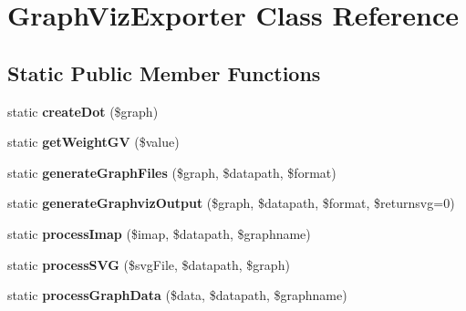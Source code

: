 \hypertarget{classGraphVizExporter}{
\section{GraphVizExporter Class Reference}
\label{classGraphVizExporter}
}
\subsection*{Static Public Member Functions}
\begin{DoxyCompactItemize}
\item 
\hypertarget{classGraphVizExporter_a63ee3eef62e8e371f65a7b835ff7e03e}{
static {\bfseries createDot} (\$graph)}
\label{classGraphVizExporter_a63ee3eef62e8e371f65a7b835ff7e03e}

\item 
\hypertarget{classGraphVizExporter_ab48d8f07e6c16c1e822cc762b5276b0c}{
static {\bfseries getWeightGV} (\$value)}
\label{classGraphVizExporter_ab48d8f07e6c16c1e822cc762b5276b0c}

\item 
\hypertarget{classGraphVizExporter_a5ffcde0b5a56dd0a8ac57680f247520b}{
static {\bfseries generateGraphFiles} (\$graph, \$datapath, \$format)}
\label{classGraphVizExporter_a5ffcde0b5a56dd0a8ac57680f247520b}

\item 
\hypertarget{classGraphVizExporter_a7f97288f0c6800015bbe0101cbe38b7d}{
static {\bfseries generateGraphvizOutput} (\$graph, \$datapath, \$format, \$returnsvg=0)}
\label{classGraphVizExporter_a7f97288f0c6800015bbe0101cbe38b7d}

\item 
\hypertarget{classGraphVizExporter_ae10671113e79e66c0cd8b5ea3113b76c}{
static {\bfseries processImap} (\$imap, \$datapath, \$graphname)}
\label{classGraphVizExporter_ae10671113e79e66c0cd8b5ea3113b76c}

\item 
\hypertarget{classGraphVizExporter_a514360e45b911c0efcf51c3ffb4e783a}{
static {\bfseries processSVG} (\$svgFile, \$datapath, \$graph)}
\label{classGraphVizExporter_a514360e45b911c0efcf51c3ffb4e783a}

\item 
\hypertarget{classGraphVizExporter_a9312bb23e4f82aee8beee585cc28e5a3}{
static {\bfseries processGraphData} (\$data, \$datapath, \$graphname)}
\label{classGraphVizExporter_a9312bb23e4f82aee8beee585cc28e5a3}

\end{DoxyCompactItemize}
